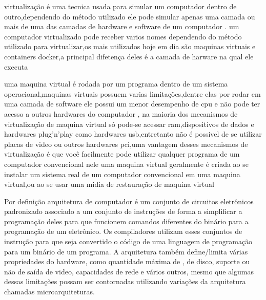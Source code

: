 \documentclass[
	12pt,				%
	openright,			%
	oneside,			%
	a4paper,			%
	english,			%
	french,				%
	spanish,			%
	brazil,				%
	]{abntex2}
\begin{document}

virtualização é uma tecnica usada para simular um computador dentro de outro,dependendo do método utilizado ele pode simular apenas uma camada ou mais de uma das camadas de hardware e software de um computador .
um computador virtualizado pode receber varios nomes dependendo do método utilizado para virtualizar,os mais utilizados hoje em dia são maquinas virtuais e containers docker,a principal difetença deles é a camada de harware na qual ele executa

uma maquina virtual é rodada por um programa dentro de um sistema operacional,maquinas virtuais possuem varias limitações,dentre elas por rodar em uma camada de software ele possui um menor desempenho de cpu e não pode ter acesso a outros hardwares do computador , na maioria dos mecanismos de virtualização de maquina virtual só pode-se acessar ram,dispositivos de dados e hardwares plug’n’play como hardwares usb,entretanto não é possivel de se utilizar placas de video ou outros hardwares pci,uma vantagem desses mecanismos de virtualização é que você facilmente pode utilizar qualquer programa de um computador convencional nele
uma maquina virtual geralmente é criada ao se instalar um sistema real de um computador convencional em uma maquina virtual,ou ao se usar uma midia de restauração de maquina virtual

Por definição arquitetura de computador é um conjunto de circuitos eletrônicos padronizado associado a um conjunto de instruções de forma a simplificar a programação deles para que funcionem comandos diferentes do binário para a programação de um eletrônico. Os compiladores utilizam esses conjuntos de instrução para que seja convertido o código de uma linguagem de programação para um binário de um programa. A arquitetura também define/limita várias propriedades do hardware, como quantidade máxima de , de disco, suporte ou não de saída de video, capacidades de rede e vários outros, mesmo que algumas dessas limitações possam ser contornadas utilizando variações da arquitetura chamadas microarquiteturas.\newline
\end{document}
